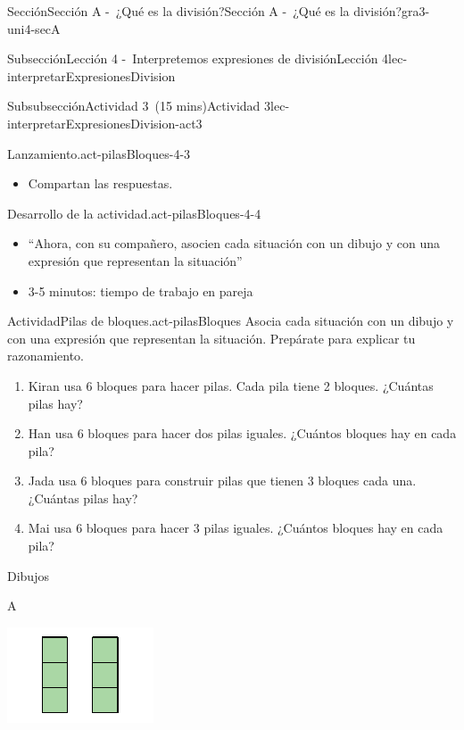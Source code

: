 \documentclass[oneside,10pt,]{article}
\begin{document}
\begin{sectionptx}{Sección}{Sección A -~¿Qué es la división?}{}{Sección A -~¿Qué es la división?}{}{}{gra3-uni4-secA}
\begin{subsectionptx}{Subsección}{Lección 4 -~Interpretemos expresiones de división}{}{Lección 4}{}{}{lec-interpretarExpresionesDivision}
\begin{subsubsectionptx}{Subsubsección}{Actividad 3~(15 mins)}{}{Actividad 3}{}{}{lec-interpretarExpresionesDivision-act3}
\begin{paragraphs}{Lanzamiento.}{act-pilasBloques-4-3}
\begin{itemize}[label=\textbullet]
\item{}Compartan las respuestas.%
\end{itemize}
\end{paragraphs}%
\begin{paragraphs}{Desarrollo de la actividad.}{act-pilasBloques-4-4}%
%
\begin{itemize}[label=\textbullet]
\item{}``Ahora, con su compañero, asocien cada situación con un dibujo y con una expresión que representan la situación''%
\item{}3-5 minutos: tiempo de trabajo en pareja%
\end{itemize}
\end{paragraphs}%
\begin{activity}{Actividad}{Pilas de bloques.}{act-pilasBloques}%
Asocia cada situación con un dibujo y con una expresión que representan la situación. Prepárate para explicar tu razonamiento.%
%
\begin{enumerate}
\item{}Kiran usa 6 bloques para hacer pilas. Cada pila tiene 2 bloques. ¿Cuántas pilas hay?%
\item{}Han usa 6 bloques para hacer dos pilas iguales. ¿Cuántos bloques hay en cada pila?%
\item{}Jada usa 6 bloques para construir pilas que tienen 3 bloques cada una. ¿Cuántas pilas hay?%
\item{}Mai usa 6 bloques para hacer 3 pilas iguales. ¿Cuántos bloques hay en cada pila?%
\end{enumerate}
Dibujos%
\begin{sidebyside}{2}{0.05}{0.05}{0.1}%
\begin{sbspanel}{0.4}%
A%
\par
\includegraphics[width=\linewidth]{external/svg-source/tikz-file-149316.pdf}

\end{sbspanel}
\end{sidebyside}
\end{activity}
\end{subsubsectionptx}
\end{subsectionptx}
\end{sectionptx}
\end{document}
